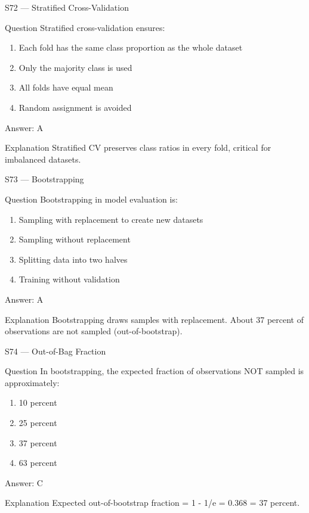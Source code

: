 \documentclass[aspectratio=169,8pt]{beamer}
\begin{document}
	\begin{frame}{S72 --- Stratified Cross-Validation}
		\begin{block}{Question}
			Stratified cross-validation ensures:
			\begin{enumerate}
				\item Each fold has the same class proportion as the whole dataset
				\item Only the majority class is used
				\item All folds have equal mean
				\item Random assignment is avoided
			\end{enumerate}
		\end{block}
		\begin{exampleblock}{Answer: A}\end{exampleblock}
		\begin{block}{Explanation}
			Stratified CV preserves class ratios in every fold, critical for imbalanced datasets.
		\end{block}
	\end{frame}
	
	\begin{frame}{S73 --- Bootstrapping}
		\begin{block}{Question}
			Bootstrapping in model evaluation is:
			\begin{enumerate}
				\item Sampling with replacement to create new datasets
				\item Sampling without replacement
				\item Splitting data into two halves
				\item Training without validation
			\end{enumerate}
		\end{block}
		\begin{exampleblock}{Answer: A}\end{exampleblock}
		\begin{block}{Explanation}
			Bootstrapping draws samples with replacement. About 37 percent of observations are not sampled (out-of-bootstrap).
		\end{block}
	\end{frame}
	
	\begin{frame}{S74 --- Out-of-Bag Fraction}
		\begin{block}{Question}
			In bootstrapping, the expected fraction of observations NOT sampled is approximately:
			\begin{enumerate}
				\item 10 percent
				\item 25 percent
				\item 37 percent
				\item 63 percent
			\end{enumerate}
		\end{block}
		\begin{exampleblock}{Answer: C}\end{exampleblock}
		\begin{block}{Explanation}
			Expected out-of-bootstrap fraction = 1 - 1/e = 0.368 = 37 percent.
		\end{block}
	\end{frame}
	
\end{document}
